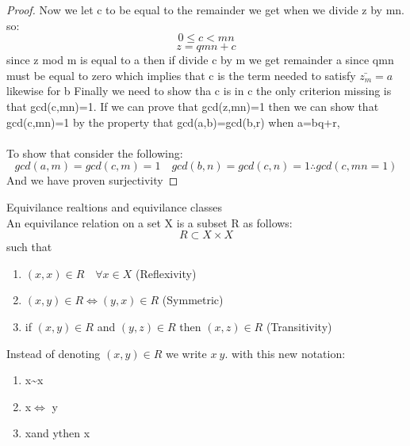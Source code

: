 \documentclass[11pt]{article}
\theoremstyle{definition}  %
\begin{document}
\begin{proof}
Now we let c to be equal to the remainder we get when we divide z by mn. so:
\[
  0\leq c <mn
\]
\[
  z=qmn+c
\]
since z mod m is equal to a then if divide c by m we get  remainder a since qmn must be equal to zero which implies that c is the term needed to satisfy $\bar{z_m}=a$ likewise for b
Finally we need to show tha c is in c the only criterion missing is that gcd(c,mn)=1.
If we can prove that gcd(z,mn)=1 then we can show that gcd(c,mn)=1 by the property that gcd(a,b)=gcd(b,r) when a=bq+r,\\\\
To show that consider the following:
\[
  gcd(a,m)=gcd(c,m)=1\quad  gcd(b,n)=gcd(c,n)=1 \therefore gcd(c,mn=1)
\]
And we have proven surjectivity



\end{proof}

 Equivilance realtions and equivilance classes\\
An equivilance relation on a set X is a subset R as follows:
\[
  R\subset X \times X
\]
such that
\begin{enumerate}
  \item $(x,x)\in R \quad \forall x\in X$ (Reflexivity)
  \item $(x,y)\in R \iff (y,x)\in R$ (Symmetric)
  \item if $(x,y)\in R$ and $(y,z)\in R$ then $(x,z)\in R$ (Transitivity)
\end{enumerate}
Instead of denoting $(x,y)\in R$ we write $x~y$. with this new notation:
\begin{enumerate}
  \item x\sim x
  \item x\simy $\iff$ y\simx
  \item x\simy and y\simz then x\simz 
\end{enumerate}
\end{document}
